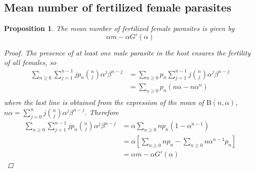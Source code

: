 \documentclass[12pt,a4paper]{article}
\theoremstyle{plain}%
\newtheorem{prop}[thm]{Proposition}
\theoremstyle{definition}
\theoremstyle{remark}
\begin{document}
	\subsection{Mean number of fertilized female parasites}
	\begin{prop}\label{hembrasfecun}
		The mean number of fertilized female parasites is given by     
		\begin{equation*}
		\alpha  m - \alpha G'(\alpha)
		\end{equation*}
		\begin{proof}
			The presence of at least one male parasite in the host ensures the fertility of all females, so
			\begin{equation*}
			\begin{split}
			\sum_{n\geq 0}\sum_{j=1}^{n-1}j p_n\binom{n}{j}\alpha^j\beta^{n-j}
			&=\sum_{n\geq 0}p_n\sum_{j=1}^{n-1} j\binom{n}{j}\alpha^j\beta^{n-j}\\
			&=\sum_{n\geq 0}p_n(n\alpha-n\alpha^n)\\
			\end{split}
			\end{equation*}
			where the last line is obtained from the expression of the mean of $\mathrm{B}(n,\alpha)$, $n\alpha=\sum_{j=0}^{n} j\binom{n} {j}\alpha^j\beta^{n-j}$. Therefore
			\begin{equation*}
			\begin{split}
			\sum_{n\geq 0}\sum_{j=1}^{n-1}jp_n\binom{n}{j}\alpha^j\beta^{n-j}
			&=\alpha\sum_{n\geq 0}np_n(1-\alpha^{n-1})\\
			&=\alpha \left[ \sum_{n\geq 0}np_n-\sum_{n\geq 0}n\alpha ^{n-1}p_n\right] \\
			&= \alpha  m - \alpha G'(\alpha) 
			\end{split}
			\end{equation*}
		\end{proof}
	\end{prop}
\end{document}
